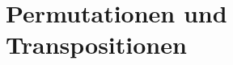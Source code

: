 %
%
%
\section{Permutationen und Transpositionen
\label{section:permutationen-und-transpositionen}}
